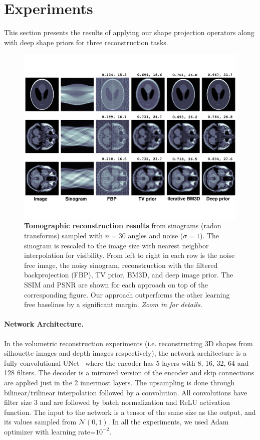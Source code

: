 \section{Experiments}
\label{sec:experiments}

This section presents the results of applying our shape projection operators along with deep shape priors for
three reconstruction tasks.

\begin{figure}
\centering
\includegraphics[width=\linewidth]{dsp/figs/CTcomparison-text.pdf}
\caption{\label{fig:ct} \textbf{Tomographic reconstruction
    results} from sinograms (radon transforms) sampled with $n = 30$
  angles and noise ($\sigma=1$). The sinogram is rescaled to the image
  size with nearest neighbor interpolation for visibility. From left
  to right in each row is the noise free image, the noisy sinogram,
  reconstruction with the filtered backprojection (FBP), TV prior,
  BM3D, and deep image prior. The SSIM and PSNR are shown for each
  approach on top of the corresponding figure. Our approach
  outperforms the other learning free baselines by a significant margin. \emph{Zoom in for details.}}
\end{figure}

\paragraph{Network Architecture.}
In the volumetric reconstruction experiments (i.e. reconstructing 3D shapes from silhouette images and depth images respectively), the network architecture is a fully convolutional UNet~\cite{ronneberger2015u} where the encoder 
has 5 layers with 8, 16, 32, 64 and 128 filters.
The decoder is a mirrored version of the encoder and skip connections are applied just in the 2 innermost layers.
The upsampling is done through bilinear/trilinear interpolation followed by a convolution.
All convolutions have filter size 3 and are followed by batch normalization and ReLU activation function.
The input to the network is a tensor of the same size as the output, and its values sampled from $\mathcal{N}(0,1)$. In all the experiments, we used Adam optimizer with learning rate=$10^{-2}$.

